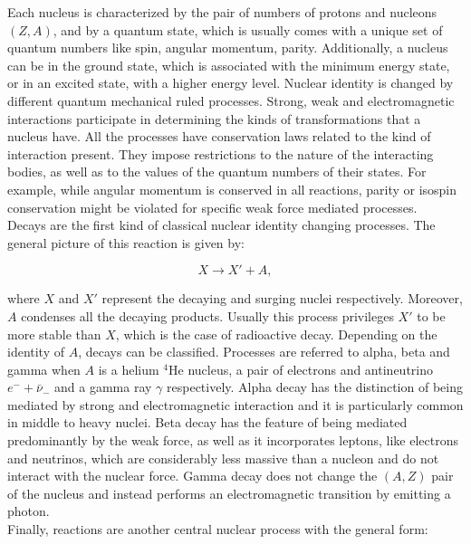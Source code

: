 \documentclass[openany]{book}
\begin{document}
Each nucleus is characterized by the pair of numbers of protons and nucleons $(Z, A)$, and by a quantum state, which is usually comes with a unique set of quantum numbers like spin, angular momentum, parity. Additionally, a nucleus can be in the ground state, which is associated with the minimum energy state, or in an excited state, with a higher energy level. Nuclear identity is changed by different quantum mechanical ruled processes.  Strong, weak and electromagnetic interactions participate in determining the kinds of transformations that a nucleus have. 	All the processes have conservation laws related to the kind of interaction present. They impose restrictions to the nature of the interacting bodies, as well as to the values of the quantum numbers of their states. For example, while angular momentum is conserved in all reactions, parity or isospin conservation might be violated for specific weak force mediated processes.  \\

Decays are the first kind of classical nuclear identity changing processes. The general picture of this reaction is given by: 

\begin{equation} \label{eq:decay_general}
	X \rightarrow X' + A,
\end{equation}

where $X$ and $X'$ represent the decaying and surging nuclei respectively. Moreover, $A$ condenses all the decaying products. Usually this process privileges $X'$ to be more stable than $X$, which is the case of radioactive decay. Depending on the identity of $A$, decays can be classified. Processes are referred to alpha, beta and gamma when $A$ is a helium $\mathrm{{}^{4}He}$ nucleus, a pair of electrons and antineutrino $e^{-} + \bar {\nu} _{-}$ and a gamma ray $\gamma$ respectively. Alpha decay has the distinction of being mediated by strong and electromagnetic interaction and it is particularly common in middle to heavy nuclei. Beta decay has the feature of being mediated predominantly by the weak force, as well as it incorporates leptons, like electrons and neutrinos, which are considerably less massive than a nucleon and do not interact with the nuclear force. Gamma decay 
does not change the $(A, Z)$ pair of the nucleus and instead performs an electromagnetic transition by emitting a photon. \\

Finally, reactions are another central nuclear  process with the general form: 
\end{document}
